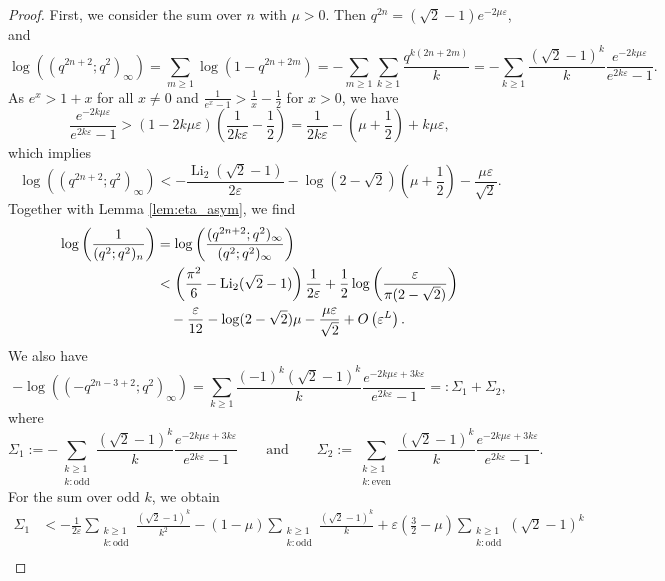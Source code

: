 \documentclass[11pt,reqno]{amsart}
\theoremstyle{remark}
\numberwithin{equation}{section}
\def\Li{\operatorname{Li}}
\def\Li{\operatorname{Li}}
\begin{document}
\begin{proof}
First, we consider the sum over $n$ with $\mu>0$. Then $q^{2n}=(\sqrt{2}-1)e^{-2\mu \varepsilon}$, and
\[
	\log\left((q^{2n+2};q^2)_\infty \right) = \sum_{m \geq 1} \log\left(1-q^{2n+2m}\right) = -\sum_{m \geq 1}\sum_{k \geq 1}\frac{q^{k(2n+2m)}}{k} 
	= -\sum_{k \geq 1} \frac{(\sqrt{2}-1)^k}{k}\frac{e^{-2k\mu\varepsilon}}{e^{2k\varepsilon}-1}.
\]
As $e^x> 1+x$ for all $x \neq 0$ and $\frac{1}{e^x-1}>\frac{1}{x}-\frac{1}{2}$ for $x>0$, we have
\[
	\frac{e^{-2k\mu\varepsilon}}{e^{2k\varepsilon}-1} > (1-2k\mu\varepsilon)\left(\frac{1}{2k\varepsilon} -\frac12 \right) = \frac{1}{2k\varepsilon} - \left( \mu +\frac12 \right) + k\mu \varepsilon,
\]
which implies
\[
	\log\left((q^{2n+2};q^2)_\infty \right)  < -\frac{\Li_2(\sqrt{2}-1)}{2\varepsilon} - \log(2-\sqrt{2})\left( \mu +\frac12 \right)-\frac{\mu\varepsilon}{\sqrt{2}} .
\]
Together with Lemma \ref{lem:eta_asym}, we find
\begin{align}
	 \log\left(\frac{1}{(q^2;q^2)_n}\right)& =\log\left(\frac{(q^{2n+2};q^2)_\infty}{(q^2;q^2)_\infty} \right) \notag\\
    & <  \left(\frac{\pi^2}{6}-\Li_2(\sqrt{2}-1)\right)\frac{1}{2\varepsilon} + \frac{1}{2} \log\left(\frac{\varepsilon}{\pi(2-\sqrt{2})} \right) \notag \\ & \quad - \frac{\varepsilon}{12} -\log(2-\sqrt{2}) \mu -\frac{\mu\varepsilon}{\sqrt{2}}+ O\left(\varepsilon^L\right). \label{pro6.3_1}
\end{align}
We also have
\[
	- \log\left((-q^{2n-3+2};q^2)_\infty\right)%
	= \sum_{k \geq 1} \frac{(-1)^{k} (\sqrt{2}-1)^k}{k} \frac{e^{-2k\mu \varepsilon +3k\varepsilon}}{e^{2k\varepsilon}-1} =:\Sigma_1 + \Sigma_2,
\]
where
\[
	\Sigma_1:= - \sum_{\substack{k \geq 1\\k: \text{odd}}} \frac{(\sqrt{2}-1)^k}{k} \frac{e^{-2k\mu \varepsilon +3k\varepsilon}}{e^{2k\varepsilon}-1} \qquad\text{and}\qquad  
	\Sigma_2:= \sum_{\substack{k \geq 1\\k: \text{even}}} \frac{(\sqrt{2}-1)^k}{k} \frac{e^{-2k\mu \varepsilon +3k\varepsilon}}{e^{2k\varepsilon}-1}.
\]
For the sum over odd $k$, we obtain
\begin{align*}
	\Sigma_1
	 &< - \frac1{2\varepsilon} \sum_{\substack{k \geq 1\\k: \text{odd}}} \frac{(\sqrt{2}-1)^k}{k^2} - (1-\mu) \sum_{\substack{k \geq 1\\k: \text{odd}}} \frac{(\sqrt{2}-1)^k}{k} + \varepsilon \left( \frac32-\mu \right) \sum_{\substack{k \geq 1\\k: \text{odd}}} (\sqrt{2}-1)^k\\

\end{align*}
\end{proof}
\end{document}

